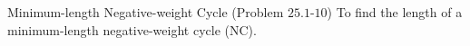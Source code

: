 \begin{frame}{}
  \begin{exampleblock}{Minimum-length Negative-weight Cycle (Problem $25.1$-$10$)}
    To find the length of a minimum-length negative-weight cycle (\textsf{NC}).
  \end{exampleblock}
\end{frame}

\begin{frame}{}
\end{frame}

\begin{frame}{}
\end{frame}

\begin{frame}{}
\end{frame}
